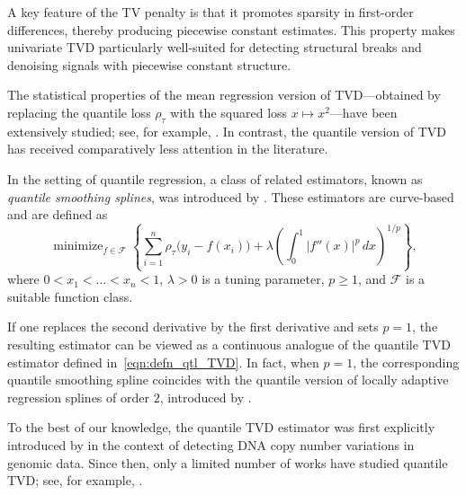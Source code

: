 \documentclass[11pt]{article}
\theoremstyle{plain}
\theoremstyle{definition}
\theoremstyle{remark}
\begin{document}
A key feature of the TV penalty is that it promotes sparsity in first-order differences, thereby producing piecewise constant estimates. This property makes univariate TVD particularly well-suited for detecting structural breaks and denoising signals with piecewise constant structure.

The statistical properties of the mean regression version of TVD—obtained by replacing the quantile loss $\rho_{\tau}$ with the squared loss $x \mapsto x^2$—have been extensively studied; see, for example, \cite{Tibshirani2013AdaptivePP, tibshirani2022divided, guntuboyina2020adaptive, dalalyan2017prediction, harchaoui2010multiple, lin2017sharp, ortelli2018total, ortelli2021prediction, sadhanala2019additive, sadhanala2024multivariate, chatterjee2026minmaxtrendfilteringgeneralizations}. In contrast, the quantile version of TVD has received comparatively less attention in the literature.


In the setting of quantile regression, a class of related estimators, known as \emph{quantile smoothing splines}, was introduced by \cite{koenker1994quantile}. These estimators are curve-based and are defined as
\[
\mathop{\mathrm{minimize}}_{f \in \mathcal{F}} \left\{ \sum_{i=1}^n \rho_\tau \bigl( y_i - f(x_i) \bigr) + \lambda \left( \int_0^1 |f''(x)|^p \, dx \right)^{1/p} \right\},
\]
where $0 < x_1 < \dots < x_n < 1$, $\lambda > 0$ is a tuning parameter, $p \ge 1$, and $\mathcal{F}$ is a suitable function class. 

If one replaces the second derivative by the first derivative and sets $p=1$, the resulting estimator can be viewed as a continuous analogue of the quantile TVD estimator defined in~\eqref{eqn:defn_qtl_TVD}. In fact, when $p=1$, the corresponding quantile smoothing spline coincides with the quantile version of locally adaptive regression splines of order $2$, introduced by \cite{mammen1997locally}.

To the best of our knowledge, the quantile TVD estimator was first explicitly introduced by \cite{li2007analysis} in the context of detecting DNA copy number variations in genomic data. Since then, only a limited number of works have studied quantile TVD; see, for example, \cite{madrid2022risk, Brantley2020, feng2024deep, zhang2025quantile, madrid2024quantile}.


\end{document}
